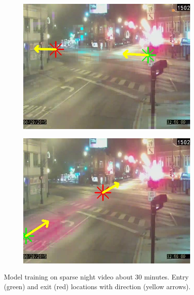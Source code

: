 \begin{figure}
        \begin{subfigure}{0.32\linewidth}
            \includegraphics[width=\linewidth]{./img/scene_learning/res/elstonIrvingPark/20150829_020000DST_elstonIrvingPark-2.jpg}
        \end{subfigure}
        \begin{subfigure}{0.32\linewidth}
            \includegraphics[width=\linewidth]{./img/scene_learning/res/elstonIrvingPark/20150829_020000DST_elstonIrvingPark-3.jpg}
        \end{subfigure}
        \caption{Model training on sparse night video about 30 minutes. Entry (green) and exit (red) locations with direction (yellow arrows).}
        \label{fig:entry-exit-night-2}
\end{figure}
